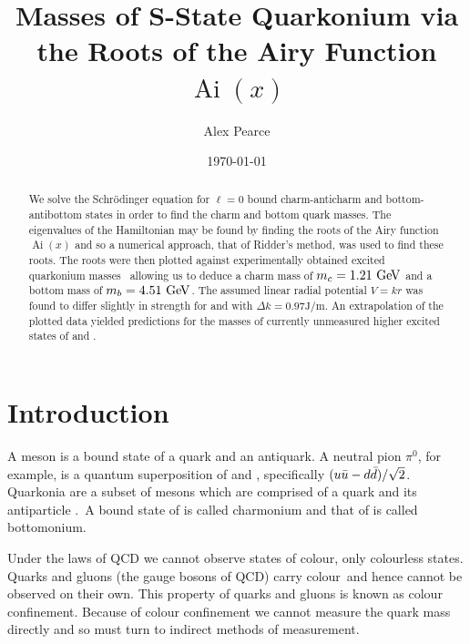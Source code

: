 \documentclass[]{article}
\newcommand{\Ai}[1]{\ensuremath{\operatorname{Ai}({#1})}}
\begin{document}
\title{Masses of S-State Quarkonium via the Roots of the Airy Function $\Ai{x}$}
\author{Alex Pearce}
\date{\today}
\maketitle


\begin{abstract}
We solve the Schr\"{o}dinger equation for $\ell = 0$ bound charm-anticharm \ccbar and bottom-antibottom \bbbar states in order to find the charm and bottom quark masses. The eigenvalues of the Hamiltonian may be found by finding the roots of the Airy function $\Ai{x}$ and so a numerical approach, that of Ridder's method, was used to find these roots. The roots were then plotted against experimentally obtained excited quarkonium masses~\cite{ref:gdaniell} allowing us to deduce a charm mass of $m_{c} = 1.21\GeV$ and a bottom mass of $m_{b} = 4.51\GeV$. The assumed linear radial potential $V = kr$ was found to differ slightly in strength for \ccbar and \bbbar with $\Delta k = 0.97\si{\joule\per\metre}$. An extrapolation of the plotted data yielded predictions for the masses of currently unmeasured higher excited states of \ccbar and \bbbar.
\end{abstract}


\section{Introduction}\label{sec:intro}

A meson is a bound state of a quark and an antiquark. A neutral pion $\pi^{0}$, for example, is a quantum superposition of \uubar and \ddbar, specifically $(u\bar{u} - d\bar{d})/\sqrt{2}$. Quarkonia are a subset of mesons which are comprised of a quark and its antiparticle \qqbar.\footnotemark\ A bound state of \ccbar is called charmonium and that of \bbbar is called bottomonium.


Under the laws of QCD we cannot observe states of colour, only colourless states. Quarks and gluons (the gauge bosons of QCD) carry colour\footnotemark\ and hence cannot be observed on their own. This property of quarks and gluons is known as colour confinement. Because of colour confinement we cannot measure the quark mass directly and so must turn to indirect methods of measurement.
\end{document}
